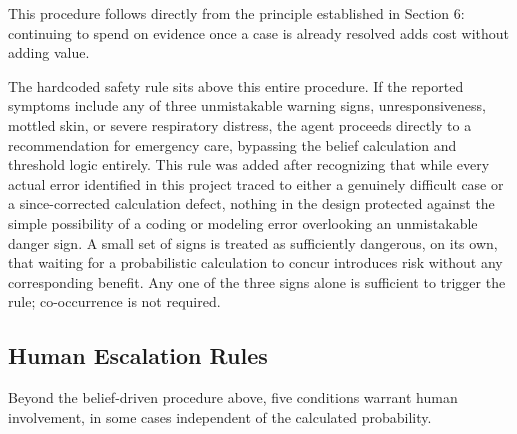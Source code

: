 \documentclass{article}
\begin{document}
This procedure follows directly from the principle established in
Section 6: continuing to spend on evidence once a case is already
resolved adds cost without adding value.

The hardcoded safety rule sits above this entire procedure. If the
reported symptoms include any of three unmistakable warning signs,
unresponsiveness, mottled skin, or severe respiratory distress, the
agent proceeds directly to a recommendation for emergency care,
bypassing the belief calculation and threshold logic entirely. This rule
was added after recognizing that while every actual error identified in
this project traced to either a genuinely difficult case or a
since-corrected calculation defect, nothing in the design protected
against the simple possibility of a coding or modeling error overlooking
an unmistakable danger sign. A small set of signs is treated as
sufficiently dangerous, on its own, that waiting for a probabilistic
calculation to concur introduces risk without any corresponding benefit.
Any one of the three signs alone is sufficient to trigger the rule;
co-occurrence is not required.

\hypertarget{human-escalation-rules}{%
\subsection{Human Escalation Rules}\label{human-escalation-rules}}

Beyond the belief-driven procedure above, five conditions warrant human
involvement, in some cases independent of the calculated probability.
\end{document}

